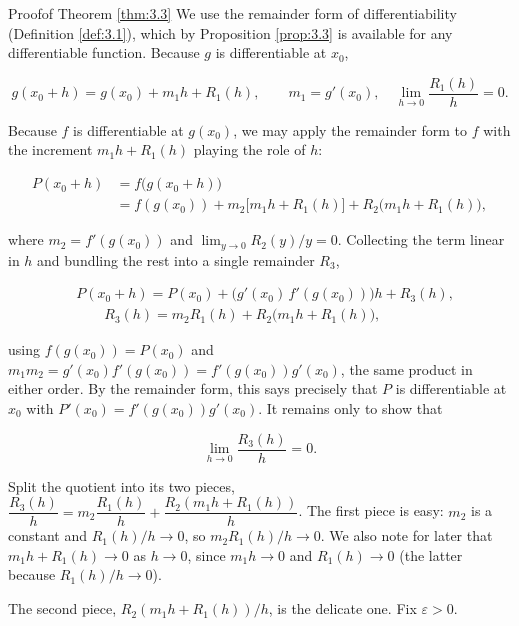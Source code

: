\documentclass[a4paper,12pt,oneside]{memoir}
\begin{document}
\begin{envproof}{Proof}{}{of Theorem \ref{thm:3.3}}
We use the remainder form of differentiability (Definition \ref{def:3.1}), which by Proposition \ref{prop:3.3} is available for any differentiable function. Because \(g\) is differentiable at \(x_{0}\),

\[ g(x_{0} + h) = g(x_{0}) + m_{1} h + R_{1}(h), \qquad m_{1} = g'(x_{0}), \quad \lim_{h \to 0}\frac{R_{1}(h)}{h} = 0. \]

Because \(f\) is differentiable at \(g(x_{0})\), we may apply the remainder form to \(f\) with the increment \(m_{1} h + R_{1}(h)\) playing the role of \(h\):

\[ \begin{aligned}
        P(x_{0}+h)
          &= f\bigl(g(x_{0}+h)\bigr) \\[2pt]
          &= f(g(x_{0})) + m_{2}\bigl[m_{1} h + R_{1}(h)\bigr] + R_{2}\bigl(m_{1} h + R_{1}(h)\bigr),
      \end{aligned} \]

where \(m_{2} = f'(g(x_{0}))\) and \(\lim_{y \to 0} R_{2}(y)/y = 0\). Collecting the term linear in \(h\) and bundling the rest into a single remainder \(R_{3}\),

\[ \begin{aligned}
        &P(x_{0}+h) = P(x_{0}) + \bigl(g'(x_{0})\,f'(g(x_{0}))\bigr) h + R_{3}(h), \\[2pt]
        &\qquad R_{3}(h) = m_{2} R_{1}(h) + R_{2}\bigl(m_{1} h + R_{1}(h)\bigr),
      \end{aligned} \]

using \(f(g(x_{0})) = P(x_{0})\) and \(m_{1} m_{2} = g'(x_{0})f'(g(x_{0})) = f'(g(x_{0}))g'(x_{0})\), the same product in either order. By the remainder form, this says precisely that \(P\) is differentiable at \(x_{0}\) with \(P'(x_{0}) = f'(g(x_{0}))g'(x_{0})\). It remains only to show that

\[ \lim_{h \to 0}\frac{R_{3}(h)}{h} = 0. \]

Split the quotient into its two pieces, \(\dfrac{R_{3}(h)}{h} = m_{2}\dfrac{R_{1}(h)}{h} + \dfrac{R_{2}(m_{1} h + R_{1}(h))}{h}\). The first piece is easy: \(m_{2}\) is a constant and \(R_{1}(h)/h \to 0\), so \(m_{2} R_{1}(h)/h \to 0\). We also note for later that \(m_{1} h + R_{1}(h) \to 0\) as \(h \to 0\), since \(m_{1} h \to 0\) and \(R_{1}(h) \to 0\) (the latter because \(R_{1}(h)/h \to 0\)).

The second piece, \(R_{2}(m_{1} h + R_{1}(h))/h\), is the delicate one. Fix \(\varepsilon > 0\).


\end{envproof}
\end{document}
